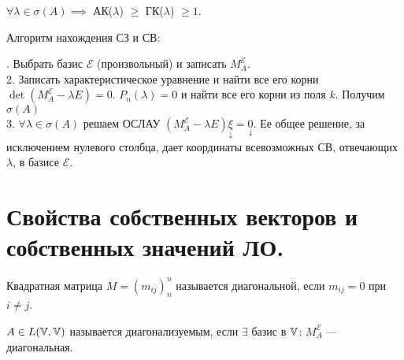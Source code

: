 \documentclass[../main.tex]{subfiles}
\begin{document}
\begin{theorem}
    $\forall \lambda \in \sigma(A ) \implies$ АК($\lambda$) $\geqslant $ ГК($\lambda$) $\geqslant 1$. 
\end{theorem}
Алгоритм нахождения СЗ и СВ:

. Выбрать базис $\mathcal{E}$ (произвольный) и записать $M_{A}^{\mathcal{E}}$.
\\2. Записать характеристическое уравнение и найти все его корни $\det{(M_{A}^{\mathcal{E}}- \lambda E)} = 0$. $P_{n}(\lambda) = 0$ и найти все его корни из поля $k$. Получим $\sigma(A)$
\\3. $\forall \lambda \in \sigma(A)$ решаем ОСЛАУ $(M_{A}^{\mathcal{E}}-\lambda E)\underset{\downarrow}{\xi} = \underset{\downarrow}{0}$. Ее общее решение, за исключением нулевого столбца, дает координаты всевозможных СВ, отвечающих $\lambda$, в базисе $\mathcal{E}$.
\section{Свойства собственных векторов и собственных значений ЛО.}

\begin{definition}
    Квадратная матрица $M = (m_{ij})_{n}^n$ называется диагональной, если $m_{ij} = 0$ при $i \neq j$.
\end{definition}
\begin{definition}
    $A \in L(\mathbb{V}, \mathbb{V})$ называется диагонализуемым, если $\exists$ базис в $\mathbb{V}$: $M_A^{\mathcal{E}}$ — диагональная.
\end{definition}
\end{document}
